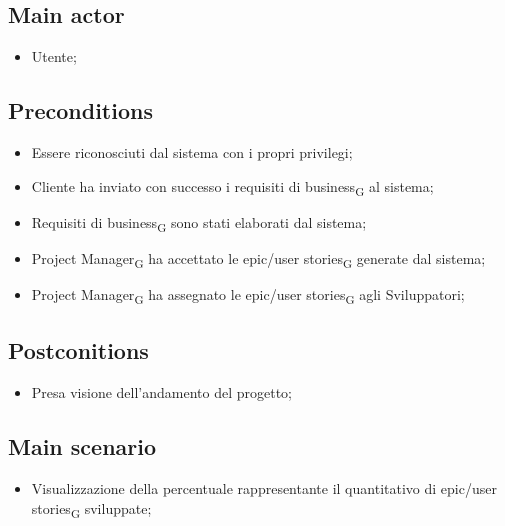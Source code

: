 \documentclass{article}
\begin{document}
    \subsection*{Main actor}
        \begin{itemize}
            \item Utente; 
        \end{itemize}
        
    \subsection*{Preconditions}
        \begin{itemize}
            \item Essere riconosciuti dal sistema con i propri privilegi;
            \item Cliente ha inviato con successo i requisiti di business\textsubscript{G} al sistema;
            \item Requisiti di business\textsubscript{G} sono stati elaborati dal sistema;
            \item Project Manager\textsubscript{G} ha accettato le epic/user stories\textsubscript{G} generate dal sistema;
            \item Project Manager\textsubscript{G} ha assegnato le epic/user stories\textsubscript{G} agli Sviluppatori;
        \end{itemize}
        
    \subsection*{Postconitions}
        \begin{itemize}
            \item Presa visione dell'andamento del progetto;
        \end{itemize}
        
    \subsection*{Main scenario}
        
        \begin{itemize}
            \item Visualizzazione della percentuale rappresentante il quantitativo di epic/user stories\textsubscript{G} sviluppate;
        \end{itemize}
        
\end{document}
